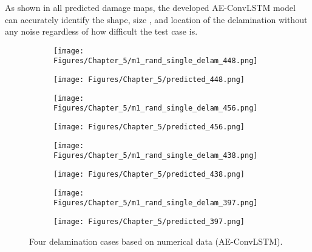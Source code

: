 As shown in all predicted damage maps, the developed AE-ConvLSTM model can accurately identify the shape, size , and location of the delamination without any noise regardless of how difficult the test case is.

\begin{figure} [!ht]
	\centering
	\begin{subfigure}[b]{.48\textwidth}
		\centering
		\texttt{[image: Figures/Chapter\_5/m1\_rand\_single\_delam\_448.png]}
		\caption{}
		\label{fig:RMS_448}
	\end{subfigure}
	\hfill
	\begin{subfigure}[b]{.48\textwidth}
		\centering
		\texttt{[image: Figures/Chapter\_5/predicted\_448.png]}
		\caption{}
		\label{fig:convlstm_pred_448}	
	\end{subfigure}
	\hfill
	\begin{subfigure}[b]{.48\textwidth}
		\centering
		\texttt{[image: Figures/Chapter\_5/m1\_rand\_single\_delam\_456.png]}
		\caption{}
		\label{fig:RMS_456}
	\end{subfigure}
	\hfill
	\begin{subfigure}[b]{.48\textwidth}
		\centering
		\texttt{[image: Figures/Chapter\_5/predicted\_456.png]}
		\caption{}
		\label{fig:convlstm_pred_456}	
	\end{subfigure}
	\hfill
	\begin{subfigure}[b]{.48\textwidth}
		\centering
		\texttt{[image: Figures/Chapter\_5/m1\_rand\_single\_delam\_438.png]}
		\caption{}
		\label{fig:RMS_438}
	\end{subfigure}
	\hfill
	\begin{subfigure}[b]{.48\textwidth}
		\centering
		\texttt{[image: Figures/Chapter\_5/predicted\_438.png]}
		\caption{}
		\label{fig:convlstm_pred_438}	
	\end{subfigure}
	\hfill
	\begin{subfigure}[b]{.48\textwidth}
		\centering
		\texttt{[image: Figures/Chapter\_5/m1\_rand\_single\_delam\_397.png]}
		\caption{}
		\label{fig:RMS_397}
	\end{subfigure}
	\hfill
	\begin{subfigure}[b]{.48\textwidth}
		\centering
		\texttt{[image: Figures/Chapter\_5/predicted\_397.png]}
		\caption{}
		\label{fig:convlstm_pred_397}	
	\end{subfigure}
	\caption{Four delamination cases based on numerical data (AE-ConvLSTM).}
	\label{fig:Num_convlstm__case}
\end{figure}
